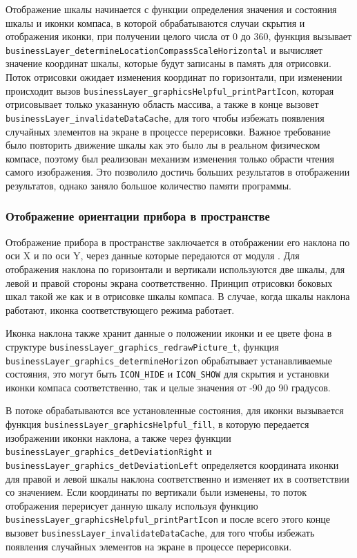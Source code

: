 Отображение шкалы начинается с функции определения значения и состояния шкалы и иконки компаса, в которой обрабатываются случаи скрытия и отображения иконки, при получении целого числа
от 0 до 360, функция вызывает \lstinline{businessLayer_determineLocationCompassScaleHorizontal} и вычисляет значение координат шкалы, которые будут записаны в память для отрисовки.
Поток отрисовки ожидает изменения координат по горизонтали, при изменении происходит вызов \lstinline{businessLayer_graphicsHelpful_printPartIcon}, которая отрисовывает только указанную
область массива, а также в конце вызовет \lstinline{businessLayer_invalidateDataCache}, для того чтобы избежать появления случайных элементов на экране в процессе перерисовки.
Важное требование было повторить движение шкалы как это было лы в реальном физическом компасе, поэтому был реализован механизм изменения только обрасти чтения самого изображения.
Это позволило достичь больших результатов в отображении результатов, однако заняло большое количество памяти программы.

\subsubsection{Отображение ориентации прибора в пространстве}

Отображение прибора в пространстве заключается в отображении его наклона по оси X и по оси Y, через данные которые передаются от модуля \moduleOrientationAzimuth.
Для отображения наклона по горизонтали и вертикали используются две шкалы, для левой и правой стороны экрана соответственно. Принцип отрисовки боковых шкал такой же как
и в отрисовке шкалы компаса. В случае, когда шкалы наклона работают, иконка соответствующего режима работает. 

Иконка наклона также хранит данные о положении иконки и ее цвете фона в структуре \lstinline{businessLayer_graphics_redrawPicture_t}, функция \lstinline{businessLayer_graphics_determineHorizon}
обрабатывает устанавливаемые состояния, это могут быть \lstinline{ICON_HIDE} и \lstinline{ICON_SHOW} для скрытия и установки иконки компаса соответственно, 
так и целые значения от -90 до 90 градусов.

В потоке обрабатываются все установленные состояния, для иконки вызывается функция \lstinline{businessLayer_graphicsHelpful_fill}, в которую передается
изображении иконки наклона, а также через функции \lstinline{businessLayer_graphics_detDeviationRight} и \lstinline{businessLayer_graphics_detDeviationLeft} определяется координата иконки
для правой и левой шкалы наклона соответственно и изменяет их в соответствии со значением. Если координаты по вертикали были изменены, то поток отображения перерисует данную шкалу
используя функцию \lstinline{businessLayer_graphicsHelpful_printPartIcon} и после всего этого конце вызовет \lstinline{businessLayer_invalidateDataCache},
для того чтобы избежать появления случайных элементов на экране в процессе перерисовки.

